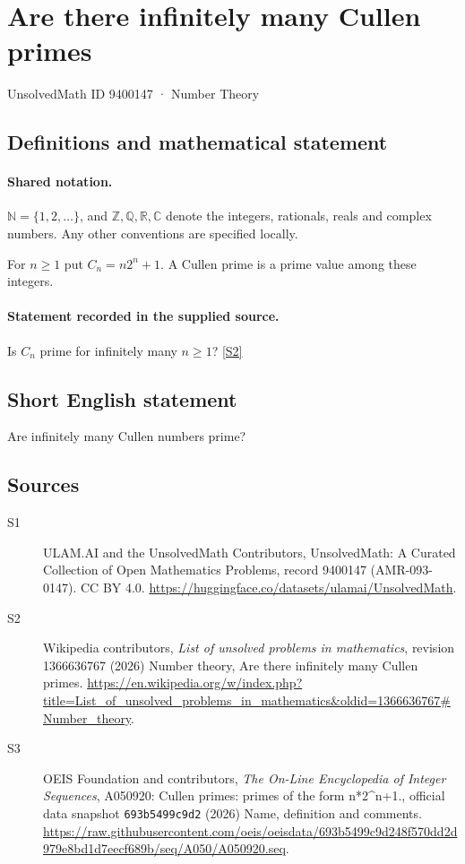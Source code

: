 \documentclass[11pt]{article}
\newcommand{\sref}[2]{\hyperlink{source:#1:#2}{[S#2]}}
\begin{document}
\setcounter{section}{9400146}
\section{Are there infinitely many Cullen primes}\label{9400147}
{\small\sffamily UnsolvedMath ID 9400147 · Number Theory}
\subsection{Definitions and mathematical statement}

\paragraph{Shared notation.}$\mathbb N=\{1,2,\ldots\}$, and $\mathbb Z,\mathbb Q,\mathbb R,\mathbb C$ denote the integers, rationals, reals and complex numbers. Any other conventions are specified locally.


For $n\ge1$ put $C_n=n2^n+1$. A Cullen prime is a prime value among these integers.
\paragraph{Statement recorded in the supplied source.}
Is $C_n$ prime for infinitely many $n\ge1$? \sref{9400147}{2}
\subsection{Short English statement}
Are infinitely many Cullen numbers prime?
\subsection{Sources}
\begin{description}
\item[\hypertarget{source:9400147:1}{S1}] ULAM.AI and the UnsolvedMath Contributors, UnsolvedMath: A Curated Collection of Open Mathematics Problems, record 9400147 (AMR-093-0147). CC BY 4.0. \url{https://huggingface.co/datasets/ulamai/UnsolvedMath}.
\item[\hypertarget{source:9400147:2}{S2}] Wikipedia contributors, \emph{List of unsolved problems in mathematics}, revision 1366636767 (2026) Number theory, Are there infinitely many Cullen primes. \url{https://en.wikipedia.org/w/index.php?title=List_of_unsolved_problems_in_mathematics&oldid=1366636767#Number_theory}.
\item[\hypertarget{source:9400147:3}{S3}] OEIS Foundation and contributors, \emph{The On-Line Encyclopedia of Integer Sequences}, A050920: Cullen primes: primes of the form n*2\textasciicircum{}n+1., official data snapshot \texttt{693b5499c9d2} (2026) Name, definition and comments. \url{https://raw.githubusercontent.com/oeis/oeisdata/693b5499c9d248f570dd2d979e8bd1d7eecf689b/seq/A050/A050920.seq}.
\end{description}
\label{end:9400147}
\end{document}
